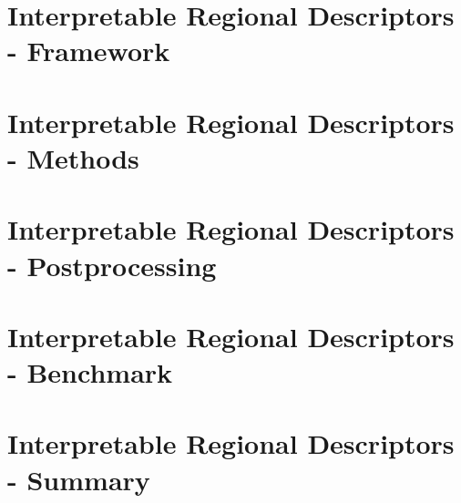 \documentclass[11pt,compress,t,n
otes=noshow, aspectratio=169, xcolor=table]{beamer}
\begin{document}
	\section{Interpretable Regional Descriptors - Framework}
	
	
	\section{Interpretable Regional Descriptors - Methods}
	
	
	\section{Interpretable Regional Descriptors - Postprocessing}
	
	
	
	\section{Interpretable Regional Descriptors - Benchmark}
	
	
	\section{Interpretable Regional Descriptors - Summary}
	
	
\end{document}
